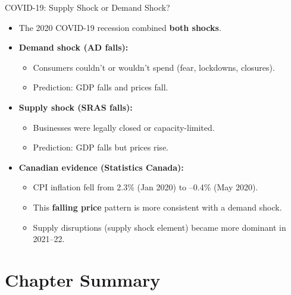 \documentclass[aspectratio=169]{beamer}
\begin{document}
\begin{frame}{COVID-19: Supply Shock or Demand Shock?}
\transfade
\begin{itemize}
  \item The 2020 COVID-19 recession combined \textbf{both shocks}.
  \item \textbf{Demand shock (AD falls):}
  \begin{itemize}
    \item Consumers couldn't or wouldn't spend (fear, lockdowns, closures).
    \item Prediction: GDP falls \alert{and} prices fall.
  \end{itemize}
  \item \textbf{Supply shock (SRAS falls):}
  \begin{itemize}
    \item Businesses were legally closed or capacity-limited.
    \item Prediction: GDP falls \alert{but} prices rise.
  \end{itemize}
  \item \textbf{Canadian evidence (Statistics Canada):}
  \begin{itemize}
    \item CPI inflation fell from 2.3\% (Jan 2020) to \alert{--0.4\%} (May 2020).
    \item This \textbf{falling price} pattern is more consistent with a \textcolor{leafgreen}{demand shock}.
    \item Supply disruptions (supply shock element) became more dominant in 2021--22.
  \end{itemize}
\end{itemize}
\end{frame}

\section*{Chapter Summary}
\end{document}
